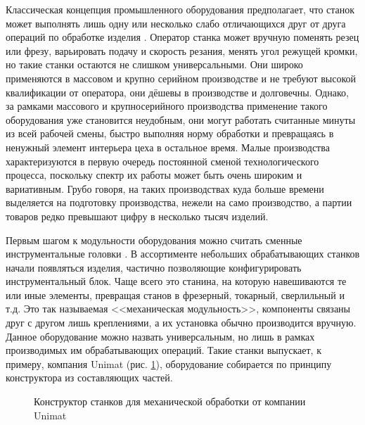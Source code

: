 Классическая концепция промышленного оборудования предполагает, что станок может выполнять лишь одну или несколько слабо отличающихся друг от друга операций по обработке изделия \cite{Averchenkov}. Оператор станка может вручную поменять резец или фрезу, варьировать подачу и скорость резания, менять угол режущей кромки, но такие станки остаются не слишком универсальными. Они широко применяются в массовом и крупно серийном производстве и не требуют высокой квалификации от оператора, они дёшевы в производстве и долговечны. Однако, за рамками массового и крупносерийного производства применение такого оборудования уже становится неудобным, они могут работать считанные минуты из всей рабочей смены, быстро выполняя норму обработки и превращаясь в ненужный элемент интерьера цеха в остальное время. Малые производства характеризуются в первую очередь постоянной сменой технологического процесса, поскольку спектр их работы может быть очень широким и вариативным. Грубо говоря, на таких производствах куда больше времени выделяется на подготовку производства, нежели на само производство, а партии товаров редко превышают цифру в несколько тысяч изделий.

Первым шагом к модульности оборудования можно считать сменные инструментальные головки \cite{Averjianov}. В ассортименте небольших обрабатывающих станков начали появляться изделия, частично позволяющие конфигурировать инструментальный блок. Чаще всего это станина, на которую навешиваются те или иные элементы, превращая станов в фрезерный, токарный, сверлильный и т.д. Это так называемая <<механическая модульность>>, компоненты связаны друг с другом лишь креплениями, а их установка обычно производится вручную. Данное оборудование можно назвать универсальным, но лишь в рамках производимых им обрабатывающих операций. Такие станки выпускает, к примеру, компания Unimat (рис. \cref{fig:unimat_ml_technics}), оборудование собирается по принципу конструктора из составляющих частей.

\begin{figure}[h]
	\caption{Конструктор станков для механической обработки от компании Unimat}\label{fig:unimat_ml_technics}
\end{figure}

